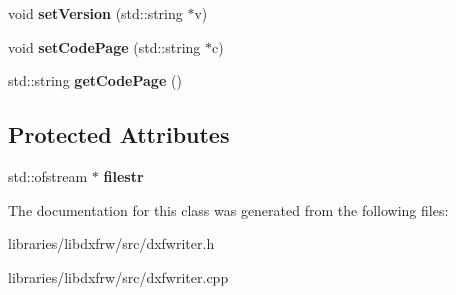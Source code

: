 \begin{DoxyCompactItemize}
\item 
\hypertarget{classdxfWriter_a1cc7a45291d6124387647ef6297fc9fd}{void {\bfseries set\-Version} (std\-::string $\ast$v)}\label{classdxfWriter_a1cc7a45291d6124387647ef6297fc9fd}

\item 
\hypertarget{classdxfWriter_a326e6fe9da46d450eeb075a56686d12c}{void {\bfseries set\-Code\-Page} (std\-::string $\ast$c)}\label{classdxfWriter_a326e6fe9da46d450eeb075a56686d12c}

\item 
\hypertarget{classdxfWriter_a9bdfe8ff84e82ffa452af2c963601ee2}{std\-::string {\bfseries get\-Code\-Page} ()}\label{classdxfWriter_a9bdfe8ff84e82ffa452af2c963601ee2}

\end{DoxyCompactItemize}
\subsection*{Protected Attributes}
\begin{DoxyCompactItemize}
\item 
\hypertarget{classdxfWriter_ad5829abb51dfc015890bf184c2beadea}{std\-::ofstream $\ast$ {\bfseries filestr}}\label{classdxfWriter_ad5829abb51dfc015890bf184c2beadea}

\end{DoxyCompactItemize}


The documentation for this class was generated from the following files\-:\begin{DoxyCompactItemize}
\item 
libraries/libdxfrw/src/dxfwriter.\-h\item 
libraries/libdxfrw/src/dxfwriter.\-cpp\end{DoxyCompactItemize}
